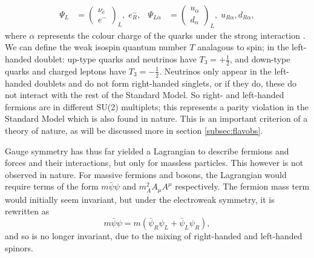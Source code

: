 \documentclass[a4paper,12pt]{article}
\begin{document}
\begin{align}
    \label{eq:doublet}
    \Psi_L &=\begin{pmatrix} \nu_e \\ e^- \end{pmatrix}_L,\; e_R^-, & \Psi_{L\alpha} &=\begin{pmatrix} u_\alpha \\ d_\alpha\end{pmatrix}_L,\; u_{R\alpha},d_{R\alpha},
\end{align}
where $\alpha$ represents the colour charge of the quarks under the strong interaction \cite{m}.
We can define the weak isospin quantum number $T$ analagous to spin; in the left-handed doublet: up-type quarks and neutrinos have $T_3=+\frac12$, and down-type quarks and charged leptons have $T_3=-\frac12$.
Neutrinos only appear in the left-handed doublets and do not form right-handed singlets, or if they do, these do not interact with the rest of the Standard Model.
So right- and left-handed fermions are in different SU(2) multiplets; this represents a parity violation in the Standard Model which is also found in nature. 
This is an important criterion of a theory of nature, as will be discussed more in section \ref{subsec:flavobs}.

Gauge symmetry has thus far yielded a Lagrangian to describe fermions and forces and their interactions, but only for massless particles. 
This however is not observed in nature. 
For massive fermions and bosons, the Lagrangian would require terms of the form $m\bar{\psi}\psi$ and $m_A^2A_\mu A^\mu$ respectively.
The fermion mass term would initially seem invariant, but under the electroweak symmetry, it is rewritten as
\begin{equation}
    \label{eq:mass}
    m\bar{\psi}\psi = m(\bar{\psi}_R\psi_L+\bar{\psi}_L\psi_R),
\end{equation}
and so is no longer invariant, due to the mixing of right-handed and left-handed spinors. 
\end{document}
